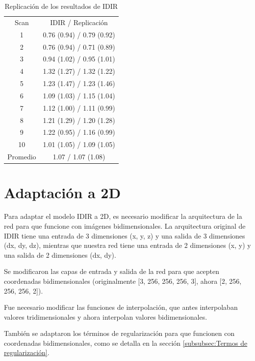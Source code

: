 \begin{table}[ht]
    \centering
    \caption{Replicación de los resultados de IDIR}
    \begin{tabular}{c|c}
        Scan & {IDIR / Replicación} \\
        1  & 0.76 (0.94) / 0.79 (0.92) \\
        2  & 0.76 (0.94) / 0.71 (0.89) \\
        3  & 0.94 (1.02) / 0.95 (1.01) \\
        4  & 1.32 (1.27) / 1.32 (1.22) \\
        5  & 1.23 (1.47) / 1.23 (1.46) \\
        6  & 1.09 (1.03) / 1.15 (1.04) \\
        7  & 1.12 (1.00) / 1.11 (0.99) \\
        8  & 1.21 (1.29) / 1.20 (1.28) \\
        9  & 1.22 (0.95) / 1.16 (0.99) \\
        10 & 1.01 (1.05) / 1.09 (1.05) \\
        Promedio & 1.07 / 1.07 (1.08) \\
    \end{tabular}
    \label{tab:comparison}
\end{table}

\section{Adaptación a 2D}
\label{sec:Adaptación a 2D}

Para adaptar el modelo IDIR a 2D, es necesario modificar la arquitectura de la red para que funcione con imágenes bidimensionales.
La arquitectura original de IDIR tiene una entrada de 3 dimensiones (x, y, z) y una salida de 3 dimensiones (dx, dy, dz),
mientras que nuestra red tiene una entrada de 2 dimensiones (x, y) y una salida de 2 dimensiones (dx, dy).

Se modificaron las capas de entrada y salida de la red para que acepten coordenadas bidimensionales (originalmente [3, 256, 256, 256, 3], ahora [2, 256, 256, 256, 2]).

Fue necesario modificar las funciones de interpolación, que antes interpolaban valores tridimensionales y ahora interpolan valores bidimensionales.

También se adaptaron los términos de regularización para que funcionen con coordenadas bidimensionales, como se detalla en la sección \ref{subsubsec:Termos de regularización}.

